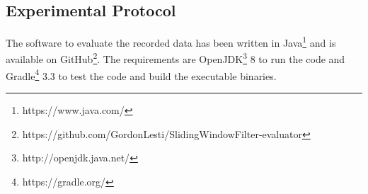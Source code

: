 \subsection{Experimental Protocol} \label{experimental_protocol}
The software to evaluate the recorded data has been written in Java\footnote{https://www.java.com/} and is available on
GitHub\footnote{https://github.com/GordonLesti/SlidingWindowFilter-evaluator}. The requirements are
OpenJDK\footnote{http://openjdk.java.net/} 8 to run the code and Gradle\footnote{https://gradle.org/} 3.3 to test the
code and build the executable binaries.




